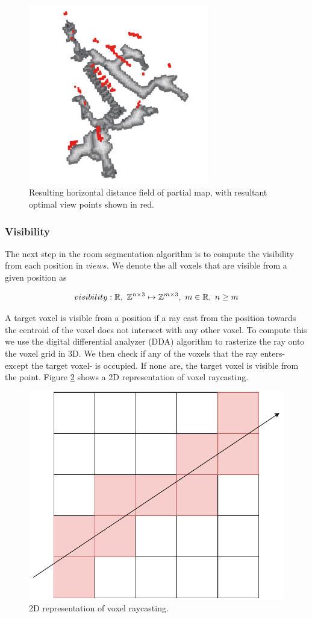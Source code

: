 \begin{figure}[h]
    \centering
    \includegraphics*[width=0.7\textwidth]{./fig/horizontal_distance_field.png}
    \caption{Resulting horizontal distance field of partial map, with resultant optimal view points shown in red.}
    \label{fig:hdf}
\end{figure}

\subsubsection{Visibility}
The next step in the room segmentation algorithm is to compute the visibility from each position in \(views\). We denote the all voxels that are visible from a given position as 

\begin{equation}
    \label{eq:visibility}
    visibility: \mathbb{R},\ \voxelset \mapsto \mathbb{Z}^{m \times 3},\ m \in \mathbb{R},\ n \geq m
\end{equation}

A target voxel is visible from a position if a ray cast from the position towards the centroid of the voxel does not intersect with any other voxel. To compute this we use the digital differential analyzer (DDA) algorithm to rasterize the ray onto the voxel grid in 3D. We then check if any of the voxels that the ray enters- except the target voxel- is occupied. If none are, the target voxel is visible from the point. Figure \ref{fig:voxel_raycast} shows a 2D representation of voxel raycasting.

\begin{figure}[h]
    \centering
    \includegraphics*[width=.5\textwidth]{./fig/voxel_raycast.pdf}
    \caption{2D representation of voxel raycasting.}
    \label{fig:voxel_raycast}

\end{figure}
\clearpage

